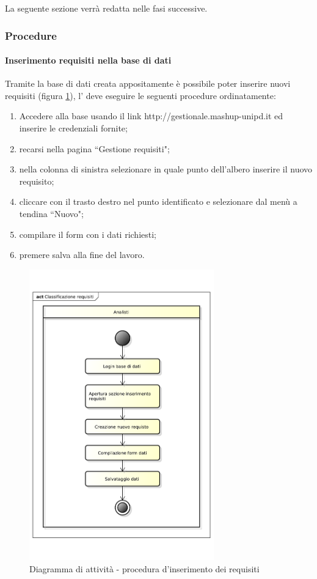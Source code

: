 La seguente sezione verrà redatta nelle fasi successive.
		\subsubsection{Procedure}

			\paragraph{Inserimento requisiti nella base di dati}
			Tramite la base di dati creata appositamente è possibile poter inserire nuovi requisiti (figura \ref{fig:procedura_inserimento_requisiti}), l'\roleAnalyst{} deve eseguire le seguenti procedure ordinatamente:

				\begin{enumerate}
			 		\item Accedere alla base usando il link http://gestionale.mashup-unipd.it ed inserire le credenziali fornite;
			 		\item recarsi nella pagina ``Gestione requisiti";
					\item nella colonna di sinistra selezionare in quale punto dell'albero inserire il nuovo requisito;
					\item cliccare con il trasto destro nel punto identificato e selezionare dal menù a tendina ``Nuovo";
					\item compilare il form con i dati richiesti;
					\item premere salva alla fine del lavoro.
			 	\end{enumerate}

			 	\begin{figure}
					\centering
					\includegraphics[width=8cm]{images/classificazione_requisiti.pdf}
					\caption{Diagramma di attività - procedura d'inserimento dei requisiti}
					\label{fig:procedura_inserimento_requisiti}
				\end{figure}

